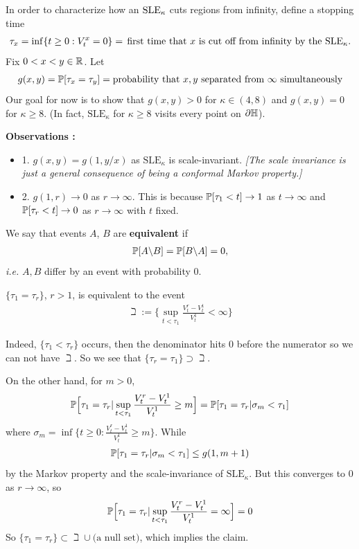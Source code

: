 \documentclass[12pt,a4paper]{article}
\newenvironment{proof}
{\begin{changemargin}{0.5cm}{0.5cm} 
	}%
	{\end{changemargin}
}
\renewenvironment{i}
{\begin{itemize} 
	}%
	{\end{itemize}
}
\newenvironment{p}
{\begin{proof} 
	}%
	{\end{proof}
}
\begin{document}
In order to characterize how an $\text{SLE}_{\kappa}$ cuts regions from infinity, define a stopping time
\begin{align*}
\tau_{x} = \inf \{t\geq 0 : V_t^x =0 \} = \, \text{first time that }x\text{ is cut off from infinity by the } \text{SLE}_{\kappa}.
\end{align*}
Fix $0<x<y \in \mathbb{R}$. Let 
\begin{align*}
g(x,y) = \mathbb{P} [\tau_x = \tau_y] = \text{probability that } x,y\text{ separated from } \infty \text{ simultaneously}
\end{align*}
Our goal for now is to show that $g(x,y) >0$ for $\kappa \in (4,8)$ and $g(x,y) = 0$ for $\kappa \geq 8$. (In fact, $\text{SLE}_{\kappa}$ for $\kappa \geq 8$ visits every point on $\partial \mathbb{H}$).
\s

\textbf{Observations :}
\begin{i}
\item[1.] $g(x,y) = g(1, y/x)$ as $\text{SLE}_{\kappa}$ is scale-invariant. \emph{[The scale invariance is just a general consequence of being a conformal Markov property.]} 
\item[2.] $g(1,r) \rightarrow 0$ as $r\rightarrow \infty$. This is because $\mathbb{P}[\tau_1 < t] \rightarrow 1$ as $t\rightarrow \infty$ and $\mathbb{P} [\tau_r < t] \rightarrow 0$ as $r\rightarrow \infty$ with $t$ fixed. 
\end{i}
\s

 We say that events $A$, $B$ are \textbf{equivalent} if 
\begin{align*}
\mathbb{P} [A \backslash B] = \mathbb{P}[B \backslash A] =0,
\end{align*}
\textit{i.e.} $A, B$ differ by an event with probability 0.
\s

\prop $\{ \tau_1 = \tau_r \}$, $r>1$, is equivalent to the event
\begin{align*}
\beth := \big\{ \sup_{t< \tau_1} \frac{V_t^r - V_t^1}{V_t^1} < \infty \big\}
\end{align*}
\begin{p}
\pf Indeed, $\{ \tau_1 < \tau_r \}$ occurs, then the denominator hits 0 before the numerator so we can not have $\beth$. So we see that $\{ \tau_r = \tau_1 \} \supset \beth$.

\quad On the other hand, for $m>0$,
\begin{align*}
\mathbb{P} \Big[ \tau_1 = \tau_r | \sup_{t <\tau_1} \frac{V_t^r - V_t^1}{V_t^1} \geq m \Big] = \mathbb{P} [\tau_1 = \tau_r | \sigma_m < \tau_1 ]
\end{align*}
where $\sigma_m = \inf \{t\geq 0 : \frac{V_t^r - V_t^1}{V_t^1} \geq m \}$. While
\begin{align*}
\mathbb{P} [\tau_1 = \tau_r | \sigma_m < \tau_1 ] \leq g(1, m+1)
\end{align*}
by the Markov property and the scale-invariance of $\text{SLE}_{\kappa}$. But this converges to 0 as $r\rightarrow \infty$, so
\begin{align*}
\mathbb{P} \Big[ \tau_1 = \tau_r | \sup_{t< \tau_1} \frac{V_t^r - V_t^1}{V_t^1} = \infty \Big]= 0
\end{align*}
So $\{ \tau_1 = \tau_r \} \subset \beth \cup \text{(a null set)}$, which implies the claim.

\eop
\end{p}
\s
\end{document}
